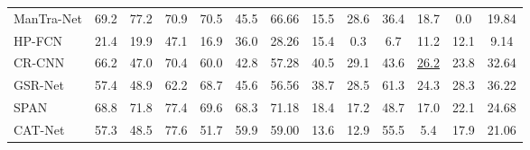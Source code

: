 \begin{table*}[ht]
{\begin{tabular}{l|cccccc|cccccc}
ManTra-Net \cite{wu2019mantra}       & 69.2                         & 77.2                         & 70.9                         & 70.5                         & 45.5                         & 66.66                        & 15.5                         & 28.6                         & 36.4                         & 18.7                        & 0.0                          & 19.84                         \\
HP-FCN \cite{li2019localization}     & 21.4                         & 19.9                         & 47.1                         & 16.9                         & 36.0                         & 28.26                        & 15.4                         & 0.3                          & 6.7                          & 11.2                        & 12.1                         & 9.14                          \\
CR-CNN \cite{yang2020constrained}    & 66.2                         & 47.0                         & 70.4                         & 60.0                         & 42.8                         & 57.28                        & 40.5                         & 29.1                         & 43.6                         & \underline{26.2}                        & 23.8                         & 32.64                         \\
GSR-Net \cite{zhou2018generate}      & 57.4                         & 48.9                         & 62.2                         & 68.7                         & 45.6                         & 56.56                        & 38.7                         & 28.5                         & 61.3                         & 24.3                        & 28.3                         & 36.22                         \\
SPAN \cite{hu2020span}               & 68.8                         & 71.8                         & 77.4                         & 69.6                         & 68.3                         & 71.18                        & 18.4                         & 17.2                         & 48.7                         & 17.0                        & 22.1                         & 24.68                         \\
CAT-Net \cite{kwon2021cat}           & 57.3                         & 48.5                         & 77.6                         & 51.7                         & 59.9                         & 59.00                        & 13.6                         & 12.9                         & 55.5                         & 5.4                         & 17.9                         & 21.06                         \\

\end{tabular}}
\end{table*}
